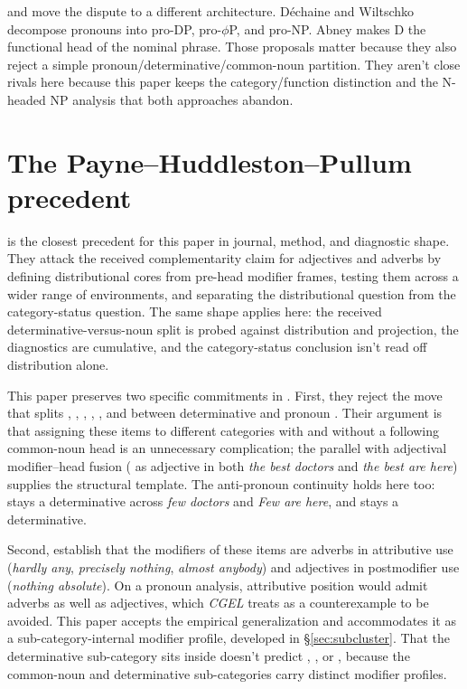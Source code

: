\documentclass[12pt]{article}
\begin{document}
\textcite{dechainewiltschko2002} and \textcite{abney1987} move the dispute to a different architecture. Déchaine and Wiltschko decompose pronouns into pro-DP, pro-$\phi$P, and pro-NP. Abney makes D the functional head of the nominal phrase. Those proposals matter because they also reject a simple pronoun/determinative/common-noun partition. They aren't close rivals here because this paper keeps the category/function distinction and the N-headed NP analysis that both approaches abandon.

\section{The Payne--Huddleston--Pullum precedent}\label{sec:php-precedent}

\textcite{payne2010} is the closest precedent for this paper in journal, method, and diagnostic shape. They attack the received complementarity claim for adjectives and adverbs by defining distributional cores from pre-head modifier frames, testing them across a wider range of environments, and separating the distributional question from the category-status question. The same shape applies here: the received determinative-versus-noun split is probed against distribution and projection, the diagnostics are cumulative, and the category-status conclusion isn't read off distribution alone.

This paper preserves two specific commitments in \textcite{payne2010}. First, they reject the move that splits , , , , , and  between determinative and pronoun \citep[13--14]{payne2010}. Their argument is that assigning these items to different categories with and without a following common-noun head is an unnecessary complication; the parallel with adjectival modifier--head fusion ( as adjective in both \textit{the best doctors} and \textit{the best are here}) supplies the structural template. The anti-pronoun continuity holds here too:  stays a determinative across \textit{few doctors} and \textit{Few are here}, and  stays a determinative.

Second, \textcite[13--14]{payne2010} establish that the modifiers of these items are adverbs in attributive use (\textit{hardly any}, \textit{precisely nothing}, \textit{almost anybody}) and adjectives in postmodifier use (\textit{nothing absolute}). On a pronoun analysis, attributive position would admit adverbs as well as adjectives, which \textit{CGEL} treats as a counterexample to be avoided. This paper accepts the empirical generalization and accommodates it as a sub-category-internal modifier profile, developed in §\ref{sec:subcluster}. That the determinative sub-category sits inside  doesn't predict , , or , because the common-noun and determinative sub-categories carry distinct modifier profiles.
\end{document}
